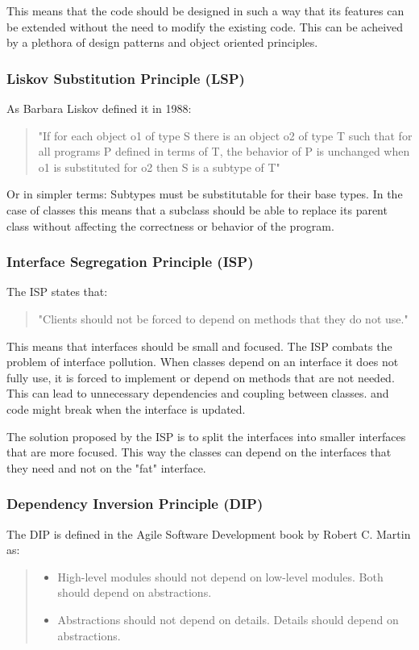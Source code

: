 \begin{spacing}{1.2}
    This means that the code should be designed in such a way that its features can be extended
    without the need to modify the existing code. This can be acheived by a plethora of design patterns and
    object oriented principles.

    \subsubsection{Liskov Substitution Principle (LSP)}
    As Barbara Liskov defined it in 1988:
    \begin{quote}
        "If for each object o1 of type S there is an object o2 of type T such that for
        all programs P defined in terms of T, the behavior of P is unchanged when o1 is
        substituted for o2 then S is a subtype of T" \cite{liskov}
    \end{quote}

    Or in simpler terms: Subtypes must be substitutable for their base types. In the case of classes
    this means that a subclass should be able to replace its parent class without affecting the
    correctness or behavior of the program.

    \subsubsection{Interface Segregation Principle (ISP)}
    The ISP states that:
    \begin{quote}
        "Clients should not be forced to depend on methods that they do not use." \cite{agileMartin}
    \end{quote}

    This means that interfaces should be small and focused.  The ISP combats the problem of interface pollution. When classes
    depend on an interface it does not fully use, it is forced to implement or depend on methods
    that are not needed. This can lead to unnecessary dependencies and coupling between classes.
    and code might break when the interface is updated.

    The solution proposed by the ISP is to split the interfaces into smaller interfaces that are
    more focused. This way the classes can depend on the interfaces that they need and not on the
    "fat" interface.

    \subsubsection{Dependency Inversion Principle (DIP)}
    The DIP is defined in the Agile Software Development book by Robert C. Martin \cite{agileMartin} as:
    \begin{quote}
        \begin{itemize}
            \item High-level modules should not depend on low-level modules. Both should depend on abstractions.
            \item Abstractions should not depend on details. Details should depend on abstractions.
        \end{itemize}
    \end{quote}


\end{spacing}
